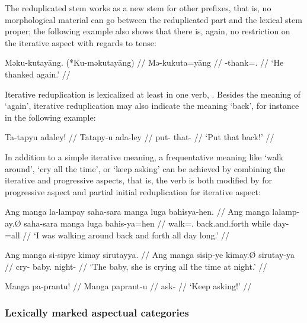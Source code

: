 The reduplicated stem works as a new stem for other prefixes, that is, no 
morphological material can go between the reduplicated part and the lexical 
stem proper; the following example also shows that there is, again, no 
restriction on the iterative aspect with regards to tense:

\ex\begingl
	\gla Məku-kutayāng. \quad \textup{(*}Ku-məkutayāng\textup{)} //
	\glb Mə-ku\til{}kuta=yāng //
	\glc \Pst{}-\Iter{}\til{}thank=\TsgM{}.\Aarg{} //
	\glft `He thanked again.' //
\endgl\xe

Iterative reduplication is lexicalized at least in one verb, 
. Besides the meaning of `again', iterative 
reduplication may also indicate the meaning `back', for instance in the 
following example:

\ex\begingl
	\gla Ta-tapyu adaley! //
	\glb Ta\til{}tapy-u ada-ley //
	\glc \Iter{}\til{}put-\Imp{} that-\PargI{} //
	\glft `Put that back!' //
\endgl\xe

In addition to a simple iterative meaning, a frequentative meaning like `walk 
around', `cry all the time', or `keep asking' can be achieved by combining the 
iterative and progressive aspects, that is, the verb is both modified by 
 for progressive aspect and partial initial reduplication for 
iterative aspect:

\pex
\a\begingl
	\gla Ang manga la-lampay saha-sara manga luga bahisya-hen. //
	\glb Ang manga la\til{}lamp-ay.Ø saha-sara manga luga bahis-ya=hen //
	\glc \AgtT{} \Prog{} \Iter{}\til{}walk=\Fsg{}.\Top{} back.and.forth 
		\Dyn{} while day-\Loc{}=all //
	\glft `I was walking around back and forth all day long.' //
\endgl

\a\begingl
	\gla Ang manga si-sipye kimay sirutayya. //
	\glb Ang manga si\til{}sip-ye kimay.Ø sirutay-ya //
	\glc \AgtT{} \Prog{} \Iter{}\til{}cry-\TsgF{} baby.\Top{} 
		night-\Loc{} //
	\glft `The baby, she is crying all the time at night.' //
\endgl

\a\begingl
	\gla Manga pa-prantu! //
	\glb Manga pa\til{}prant-u //
	\glc \Prog{} \Iter{}\til{}ask-\Imp{} //
	\glft `Keep asking!' //
\endgl

\xe


\subsubsection{Lexically marked aspectual categories}

